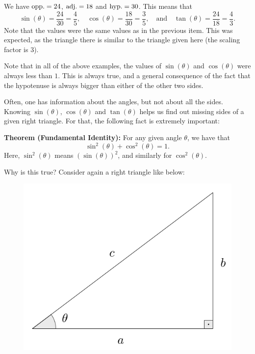 \documentclass{ximera}
\begin{document}
\begin{example}
\begin{enumerate}[label=\alph*.]
        \begin{explanation}
          We have ${\rm opp.} = 24$, ${\rm adj.} = 18$ and ${\rm hyp.} = 30$. This means that $$\sin(\theta) = \frac{24}{30}=\frac{4}{5}, \quad \cos(\theta) = \frac{18}{30}=\frac{3}{5},\quad \mbox{and}\quad \tan(\theta) = \frac{24}{18}=\frac{4}{3}.$$ Note that the values were the same values as in the previous item. This was expected, as the triangle there is similar to the triangle given here (the scaling factor is $3$).\end{explanation}    
  \end{enumerate}
\end{example}

\begin{remark}
  Note that in all of the above examples, the values of $\sin(\theta)$ and $\cos(\theta)$ were always less than $1$. This is always true, and a general consequence of the fact that the hypotenuse is always bigger than either of the other two sides.
\end{remark}

Often, one has information about the angles, but not about all the sides. Knowing $\sin(\theta)$, $\cos(\theta)$ and $\tan(\theta)$ helps us find out missing sides of a given right triangle. For that, the following fact is extremely important:

\begin{callout}
  {\bf Theorem (Fundamental Identity):} For any given angle $\theta$, we have that $$\sin^2(\theta) + \cos^2(\theta) =1.$$Here, $\sin^2(\theta)$ means $(\sin(\theta))^2$, and similarly for $\cos^2(\theta)$.
\end{callout}

Why is this true? Consider again a right triangle like below:

\begin{figure}[h]
  \centering
  \includegraphics[scale=.3]{./figures/9-1-1-identity.png}
\end{figure}
\end{document}

